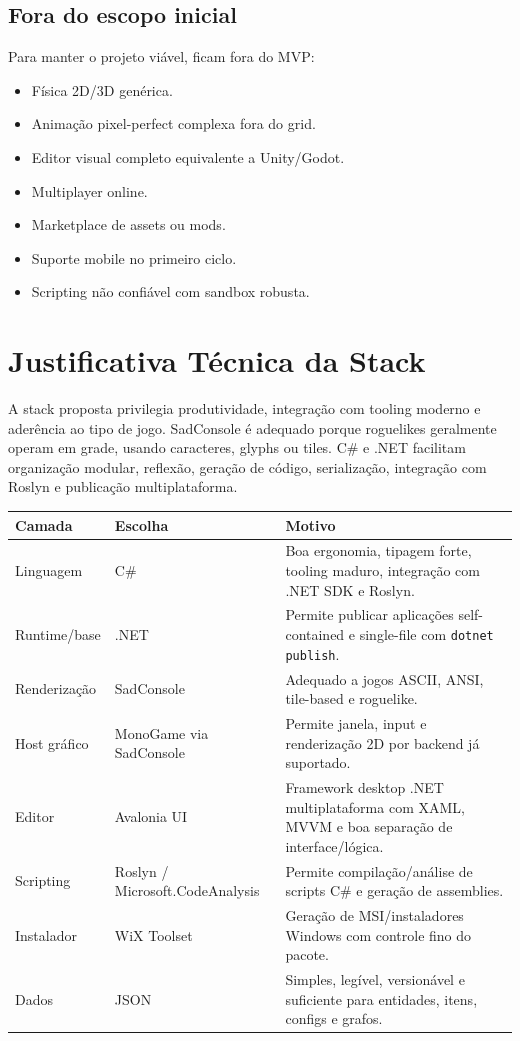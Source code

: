 \documentclass[12pt,a4paper]{article}
\begin{document}
\subsection{Fora do escopo inicial}

Para manter o projeto viável, ficam fora do MVP:

\begin{itemize}
    \item Física 2D/3D genérica.
    \item Animação pixel-perfect complexa fora do grid.
    \item Editor visual completo equivalente a Unity/Godot.
    \item Multiplayer online.
    \item Marketplace de assets ou mods.
    \item Suporte mobile no primeiro ciclo.
    \item Scripting não confiável com sandbox robusta.
\end{itemize}

\section{Justificativa Técnica da Stack}

A stack proposta privilegia produtividade, integração com tooling moderno e aderência ao tipo de jogo. SadConsole é adequado porque roguelikes geralmente operam em grade, usando caracteres, glyphs ou tiles. C\# e .NET facilitam organização modular, reflexão, geração de código, serialização, integração com Roslyn e publicação multiplataforma.

\begin{longtable}{p{3.3cm}p{4.6cm}p{6.4cm}}
\toprule
\textbf{Camada} & \textbf{Escolha} & \textbf{Motivo} \\
\midrule
Linguagem & C\# & Boa ergonomia, tipagem forte, tooling maduro, integração com .NET SDK e Roslyn. \\
Runtime/base & .NET & Permite publicar aplicações self-contained e single-file com \texttt{dotnet publish}. \\
Renderização & SadConsole & Adequado a jogos ASCII, ANSI, tile-based e roguelike. \\
Host gráfico & MonoGame via SadConsole & Permite janela, input e renderização 2D por backend já suportado. \\
Editor & Avalonia UI & Framework desktop .NET multiplataforma com XAML, MVVM e boa separação de interface/lógica. \\
Scripting & Roslyn / Microsoft.CodeAnalysis & Permite compilação/análise de scripts C\# e geração de assemblies. \\
Instalador & WiX Toolset & Geração de MSI/instaladores Windows com controle fino do pacote. \\
Dados & JSON & Simples, legível, versionável e suficiente para entidades, itens, configs e grafos. \\
\bottomrule
\end{longtable}
\end{document}
